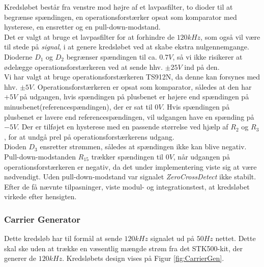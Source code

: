 Kredsløbet består fra venstre mod højre af et lavpasfilter, to dioder\cite{lib:1N4148} til at begrænse spændingen, en operationsforstærker opsat som komparator med hysterese, en ensretter og en pull-down-modstand.\\

Det er valgt at bruge et lavpasfilter for at forhindre de $120kHz$, som også vil være til stede på \textit{signal}, i at genere kredsløbet ved at skabe ekstra nulgennemgange. Dioderne $D_{1}$ og $D_{2}$ begrænser spændingen til ca. $0.7V$, så vi ikke risikerer at ødelægge operationsforstærkeren ved at sende hhv. $\pm 25V$ ind på den.\\
Vi har valgt at bruge operationsforstærkeren TS912N, da denne kan forsynes med hhv. $\pm 5V$. Operationsforstærkeren\cite{lib:TS912} er opsat som komparator, således at den har $+5V$ på udgangen, hvis spændingen på plusbenet er højere end spændingen på minusbenet(referencespændingen), der er sat til $0V$. Hvis spændingen på plusbenet er lavere end referencespændingen, vil udgangen have en spænding på $-5V$. Der er tilføjet en hysterese med en passende størrelse ved hjælp af $R_{2}$ og $R_{3}$, for at undgå prel på operationsforstærkerens udgang.\\
Dioden $D_{3}$ ensretter strømmen, således at spændingen ikke kan blive negativ. Pull-down-modstanden $R_{15}$ trækker spændingen til $0V$, når udgangen på operationsforstærkeren er negativ, da det under implementering viste sig at være nødvendigt. Uden pull-down-modstand var signalet \textit{ZeroCrossDetect} ikke stabilt.\\

Efter de få nævnte tilpasninger, viste modul- og integrationstest, at kredsløbet virkede efter hensigten.

\newpage

\subsubsection{Carrier Generator}
Dette kredsløb har til formål at sende $120kHz$ signalet ud på $50Hz$ nettet. Dette skal ske uden at trække en væsentlig mængde strøm fra det STK500-kit, der generer de $120kHz$. Kredsløbets design vises på Figur \ref{fig:CarrierGen}. \\

